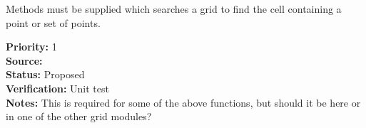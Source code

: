 
Methods must be supplied which searches a grid to find the cell
containing a point or set of points.

\begin{reqlist}
{\bf Priority:} 1 \\
{\bf Source:}  \\
{\bf Status:} Proposed \\
{\bf Verification:} Unit test \\
{\bf Notes:} This is required for some of the above functions, but
             should it be here or in one of the other grid modules?
\end{reqlist}

